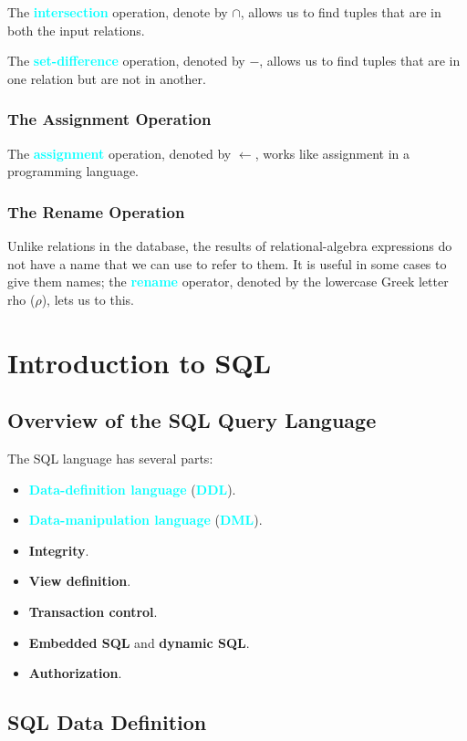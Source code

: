 \documentclass[a4paper,12pt,twoside,openany]{book}
\newcommand{\textcy}[1]{\textbf{\textcolor{cyan}{#1}}}
\begin{document}
The \textcy{intersection} operation, denote by $\cap$, allows us to find tuples that are in both the input relations.

The \textcy{set-difference} operation, denoted by $-$, allows us to find tuples that are in one relation but are not in another.

\subsection{The Assignment Operation}

The \textcy{assignment} operation, denoted by $\leftarrow$, works like assignment in a programming language.

\subsection{The Rename Operation}

Unlike relations in the database, the results of relational-algebra expressions do not have a name that we can use to refer to them. It is useful in some cases to give them names; the \textcy{rename} operator, denoted by the lowercase Greek letter rho ($\rho$), lets us to this.

\chapter{Introduction to SQL}
\section{Overview of the SQL Query Language}

The SQL language has several parts:
\begin{itemize}
    \item\textcy{Data-definition language} (\textcy{DDL}).
    \item\textcy{Data-manipulation language} (\textcy{DML}).
    \item\textbf{Integrity}.
    \item\textbf{View definition}.
    \item\textbf{Transaction control}.
    \item\textbf{Embedded SQL} and \textbf{dynamic SQL}.
    \item\textbf{Authorization}.
\end{itemize}

\section{SQL Data Definition}
\label{section:3.2}
\end{document}
